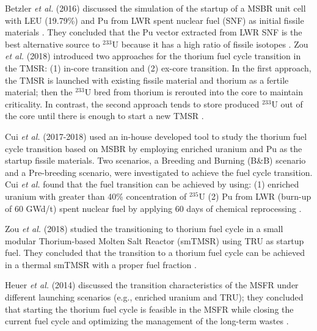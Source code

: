 Betzler \emph{et al.} (2016) discussed the simulation of the startup of a \gls{MSBR} unit
cell with \gls{LEU} (19.79\%) and Pu from \gls{LWR} spent nuclear fuel (SNF) as initial
fissile materials \cite{betzler2016modeling}. They concluded that the 
Pu vector extracted from LWR SNF is the best alternative source to 
$^{233}$U because it has a high ratio of fissile isotopes
\cite{betzler2016modeling}. Zou \emph{et al.} (2018) introduced two approaches for
the thorium fuel cycle transition in the \gls{TMSR}: (1) in-core transition and 
(2) ex-core transition. In the first approach, the TMSR is launched with 
existing fissile material and thorium as a fertile material; then the 
$^{233}$U bred from thorium is rerouted into the core to maintain criticality. 
In contrast, the second approach tends to store produced $^{233}$U out of the 
core until there is enough to start a new TMSR \cite{zou2018transition}.

Cui \emph{et al.} (2017-2018) used an in-house developed tool to study the thorium fuel cycle transition based on MSBR by employing enriched uranium and Pu as the startup fissile materials. Two scenarios, a Breeding and Burning (B\&B) scenario and a Pre-breeding scenario, were investigated to achieve the fuel cycle transition. Cui \emph{et al.} found that the fuel transition can be achieved by using: (1) enriched uranium with greater than 40\% concentration of $^{235}$U (2) Pu from LWR (burn-up of 60 GWd/t) spent nuclear fuel by applying 60 days of chemical reprocessing \cite{cui2017transition,cui2018possible}.

Zou \emph{et al.} (2018) studied the transitioning to thorium fuel
cycle in a small modular Thorium-based Molten Salt Reactor (smTMSR) using \gls{TRU}
as startup fuel. They concluded that the transition to a thorium fuel cycle can
be achieved in a thermal smTMSR with a proper fuel fraction 
\cite{zou2018preliminary}.

Heuer \emph{et al.} (2014) discussed the transition characteristics of the \gls{MSFR}
under different launching scenarios (e.g., enriched uranium and TRU); they concluded that starting the thorium fuel cycle is feasible in the MSFR while closing the current fuel cycle and optimizing the management of the long-term wastes \cite{heuer2014towards}.


